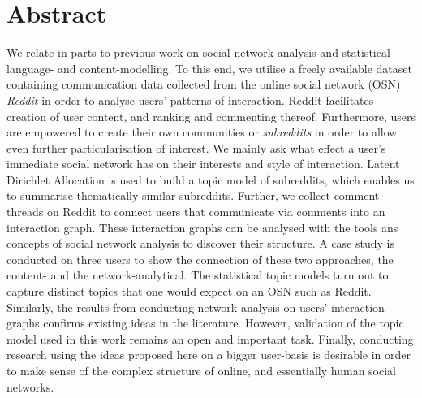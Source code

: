 \section*{Abstract}

We relate in parts to previous work on social network analysis and statistical language- and content-modelling.
To this end, we utilise a freely available dataset containing communication data collected from the online social network (OSN) \emph{Reddit} in order to analyse users' patterns of interaction.
Reddit facilitates creation of user content, and ranking and commenting thereof.
Furthermore, users are empowered to create their own communities or \emph{subreddits} in order to allow even further particularisation of interest.
We mainly ask what effect a user's immediate social network has on their interests and style of interaction.
Latent Dirichlet Allocation is used to build a topic model of subreddits, which enables us to summarise thematically similar subreddits.
Further, we collect comment threads on Reddit to connect users that communicate via comments into an interaction graph.
These interaction graphs can be analysed with the tools ans concepts of social network analysis to discover their structure.
A case study is conducted on three users to show the connection of these two approaches, the content- and the network-analytical.
The statistical topic models turn out to capture distinct topics that one would expect on an OSN such as Reddit.
Similarly, the results from conducting network analysis on users' interaction graphs confirms existing ideas in the literature.
However, validation of the topic model used in this work remains an open and important task.
Finally, conducting research using the ideas proposed here on a bigger user-basis is desirable in order to make sense of the complex structure of online, and essentially human social networks.

